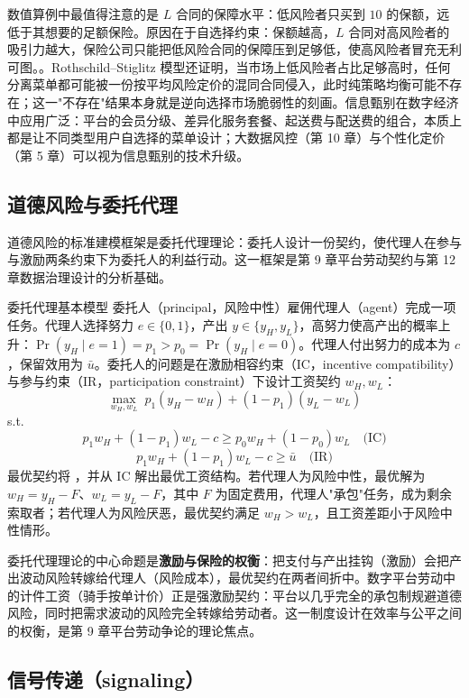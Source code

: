 数值算例中最值得注意的是 $L$ 合同的保障水平：低风险者只买到 $10$ 的保额，远低于其想要的足额保险。原因在于自选择约束：保额越高，$L$ 合同对高风险者的吸引力越大，保险公司只能把低风险合同的保障压到足够低，使高风险者冒充无利可图。。Rothschild--Stiglitz 模型还证明，当市场上低风险者占比足够高时，任何分离菜单都可能被一份按平均风险定价的混同合同侵入，此时纯策略均衡可能不存在；这一"不存在"结果本身就是逆向选择市场脆弱性的刻画。信息甄别在数字经济中应用广泛：平台的会员分级、差异化服务套餐、起送费与配送费的组合，本质上都是让不同类型用户自选择的菜单设计；大数据风控（第 10 章）与个性化定价（第 5 章）可以视为信息甄别的技术升级。

\subsection{道德风险与委托代理}

道德风险的标准建模框架是委托代理理论：委托人设计一份契约，使代理人在参与与激励两条约束下为委托人的利益行动。这一框架是第 9 章平台劳动契约与第 12 章数据治理设计的分析基础。

\begin{derivation}{委托代理基本模型}{}
委托人（principal，风险中性）雇佣代理人（agent）完成一项任务。代理人选择努力 $e \in \{0,1\}$，产出 $y \in \{y_H, y_L\}$，高努力使高产出的概率上升：$\Pr(y_H \mid e=1) = p_1 > p_0 = \Pr(y_H \mid e=0)$。代理人付出努力的成本为 $c$，保留效用为 $\bar u$。委托人的问题是在激励相容约束（IC，incentive compatibility）与参与约束（IR，participation constraint）下设计工资契约 $w_H, w_L$：
\[
\max_{w_H,w_L} \; p_1(y_H - w_H) + (1-p_1)(y_L - w_L)
\]
s.t.
\[
p_1 w_H + (1-p_1) w_L - c \geq p_0 w_H + (1-p_0) w_L \quad \text{(IC)}
\]
\[
p_1 w_H + (1-p_1) w_L - c \geq \bar u \quad \text{(IR)}
\]
最优契约将 ，并从 IC 解出最优工资结构。若代理人为风险中性，最优解为 $w_H = y_H - F$、$w_L = y_L - F$，其中 $F$ 为固定费用，代理人"承包"任务，成为剩余索取者；若代理人为风险厌恶，最优契约满足 $w_H > w_L$，且工资差距小于风险中性情形。
\end{derivation}

委托代理理论的中心命题是\textbf{激励与保险的权衡}：把支付与产出挂钩（激励）会把产出波动风险转嫁给代理人（风险成本），最优契约在两者间折中。数字平台劳动中的计件工资（骑手按单计价）正是强激励契约：平台以几乎完全的承包制规避道德风险，同时把需求波动的风险完全转嫁给劳动者。这一制度设计在效率与公平之间的权衡，是第 9 章平台劳动争论的理论焦点。
\subsection{信号传递（signaling）}

